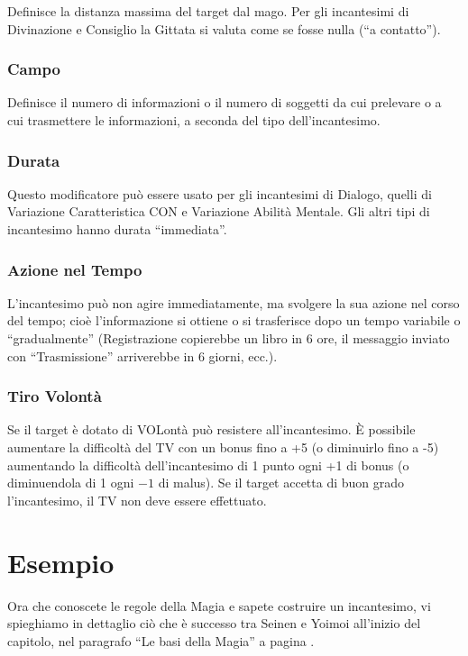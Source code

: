 Definisce la distanza massima del target dal mago. Per gli incantesimi
di Divinazione e Consiglio la Gittata si valuta come se fosse nulla (``a
contatto'').

\subsubsection{Campo} 
Definisce il numero di informazioni o il numero di soggetti da cui
prelevare o a cui trasmettere le informazioni, a seconda del tipo
dell'incantesimo.

\subsubsection{Durata} Questo
modificatore pu\`o essere usato per gli incantesimi di Dialogo, quelli di
Variazione Caratteristica CON e Variazione Abilit\`a Mentale. Gli altri tipi
di incantesimo hanno durata ``immediata''.

\iffullversion
\subsubsection{Azione nel Tempo} L'incantesimo
pu\`o non agire immediatamente, ma svolgere la sua azione nel corso
del tempo; cio\`e l'informazione si ottiene o si trasferisce dopo un
tempo variabile o ``gradualmente'' (Registrazione copierebbe un libro
in 6 ore, il messaggio inviato con ``Trasmissione'' arriverebbe in 6
giorni, ecc.).  
\fi

\subsubsection{Tiro Volont\`a}

Se il target \`e dotato di VOLont\`a pu\`o resistere all'incantesimo.
\`E possibile aumentare la difficolt\`a del TV con un bonus fino a +5
(o diminuirlo fino a -5) aumentando la difficolt\`a dell'incantesimo
di 1 punto ogni +1 di bonus (o diminuendola di 1 ogni $-1$ di malus).
Se il target accetta di buon grado l'incantesimo, il TV non deve
essere effettuato.

\iffullversion
\section{Esempio}

 Ora che conoscete le regole della
Magia e sapete costruire un incantesimo, vi spieghiamo in dettaglio
ci\`o che \`e successo tra Seinen e Yoimoi all'inizio del
capitolo, nel paragrafo ``Le basi della Magia'' a pagina \pageref{basimagia}. 

